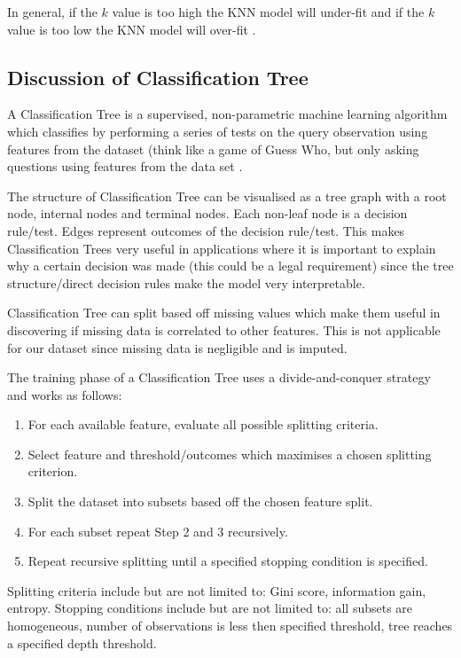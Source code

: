 \documentclass[conference]{IEEEtran}
\begin{document}
In general, if the $k$ value is too high the KNN model will under-fit and if the $k$ value is too low the KNN model will over-fit \cite[p.~193]{fundamentals}.

\subsection{Discussion of Classification Tree}

A Classification Tree is a supervised, non-parametric machine learning algorithm which classifies by performing a series of tests on the query observation using features from the dataset (think like a game of Guess Who, but only asking questions using features from the data set \cite[p.~121]{fundamentals}.

The structure of Classification Tree can be visualised as a tree graph with a root node, internal nodes and terminal nodes. Each non-leaf node is a decision rule/test. Edges represent outcomes of the decision rule/test. This makes Classification Trees very useful in applications where it is important to explain why a certain decision was made (this could be a legal requirement) since the tree structure/direct decision rules make the model very interpretable.

Classification Tree can split based off missing values which make them useful in discovering if missing data is correlated to other features. This is not applicable for our dataset since missing data is negligible and is imputed.

The training phase of a Classification Tree uses a divide-and-conquer strategy and works as follows:

\begin{enumerate}
	\item For each available feature, evaluate all possible splitting criteria.
	\item Select feature and threshold/outcomes which maximises a chosen splitting criterion.
	\item Split the dataset into subsets based off the chosen feature split.
	\item For each subset repeat Step 2 and 3 recursively.
	\item Repeat recursive splitting until a specified stopping condition is specified.
\end{enumerate}

Splitting criteria include but are not limited to: Gini score, information gain, entropy. Stopping conditions include but are not limited to: all subsets are homogeneous, number of observations is less then specified threshold, tree reaches a specified depth threshold\cite[p.~11]{info}.
\end{document}
